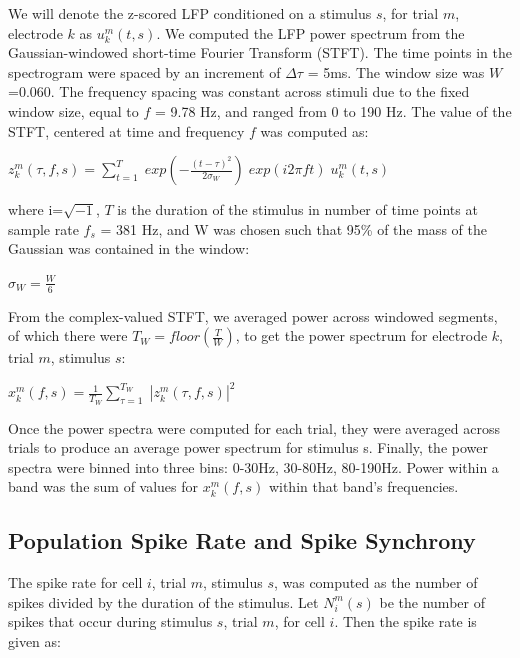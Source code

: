    We will denote the z-scored LFP conditioned on a stimulus $s$, for trial $m$, electrode $k$ as $u_k ^m (t, s)$. We computed the LFP power spectrum from the Gaussian-windowed short-time Fourier Transform (STFT). The time points in the spectrogram were spaced by an increment of $\Delta \tau$ = 5ms. The window size was $W$=0.060. The frequency spacing was constant across stimuli due to the fixed window size, equal to $f$ = 9.78 Hz, and ranged from 0 to 190 Hz. The value of the STFT, centered at time  and frequency $f$ was computed as:

\begin{center}
$z_k ^m (\tau, f, s) = \sum_{t=1}^{T}\; exp(-\frac{(t-\tau)^2}{2 \sigma_W}) \; exp(i 2 \pi f t) \; u_k^m (t, s)$
\end{center}


where i=$\sqrt{-1}$, $T$ is the duration of the stimulus in number of time points at sample rate $f_s$ = 381 Hz, and W was chosen such that 95\% of the mass of the Gaussian was contained in the window:

\begin{center}
$\sigma_W = \frac{W}{6}$
\end{center}

From the complex-valued STFT, we averaged power across  windowed segments, of which there were $T_W = floor(\frac{T}{W})$, to get the power spectrum for electrode $k$, trial $m$, stimulus $s$:

\begin{center}
$x_k^m (f, s) = \frac{1}{T_W} \sum _{\tau = 1}^{T_W} \; | z_k^m (\tau, f, s) | ^2$
\end{center}

Once the power spectra were computed for each trial, they were averaged across trials to produce an average power spectrum for stimulus s. Finally, the power spectra were binned into three bins: 0-30Hz, 30-80Hz, 80-190Hz. Power within a band was the sum of values for $x_k^m (f, s)$ within that band’s frequencies.

\subsection{Population Spike Rate and Spike Synchrony}

    The spike rate for cell $i$, trial $m$, stimulus $s$, was computed as the number of spikes divided by the duration of the stimulus. Let $N_i^m (s)$ be the number of spikes that occur during stimulus $s$, trial $m$, for cell $i$. Then the spike rate is given as:

